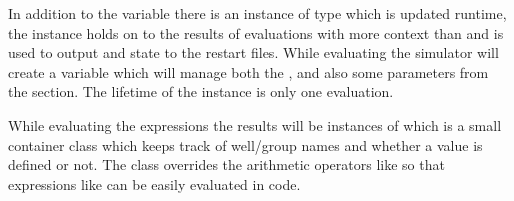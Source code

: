 In addition to the  variable there is an instance of
type  which is updated runtime, the 
instance holds on to the results of \udq{} evaluations with more context than
 and is used to output \udq{} and  state to the
restart files. While evaluating the simulator will create a 
variable which will manage both the ,
 and also some \udq{} parameters from the 
section. The lifetime of the  instance is only one \udq{}
evaluation.

While evaluating the \udq{} expressions the results will be instances of
 which is a small container class which keeps track of
well/group names and whether a value is defined or not. The 
class overrides the arithmetic operators like 
so that expressions like  can be easily evaluated in code.
